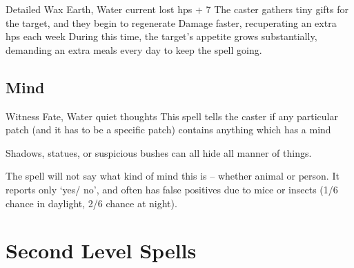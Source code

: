 \begin{multicols}{2}

  {Detailed}%
  {Wax}%
  {Earth, Water}%
  {current lost \glspl{hp} + 7}%
  {The caster gathers tiny gifts for the target, and they begin to regenerate Damage faster, recuperating an extra  \glspl{hp} each week}%
  {During this time, the target's appetite grows substantially, demanding an extra  meals every day to keep the spell going.}

\subsection{Mind}


  {}%
  {Witness}%
  {Fate, Water}%
  {quiet thoughts}%
  {This spell tells the caster if any particular patch (and it has to be a specific patch) contains anything which has a mind}%
  {Shadows, statues, or suspicious bushes can all hide all manner of things.

    The spell will not say what kind of mind this is -- whether animal or person.
    It reports only `yes/ no', and often has false positives due to mice or insects (1/6 chance in daylight, 2/6 chance at night).}

\end{multicols}

\section{Second Level Spells}

